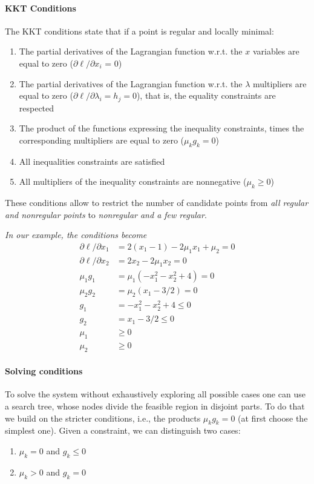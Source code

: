 \paragraph{KKT Conditions} The KKT conditions state that if a point is regular and locally minimal: 
\begin{enumerate}
	\item The partial derivatives of the Lagrangian function w.r.t. the $x$ variables are equal to zero ($\partial \ell / \partial x_i$ = 0)
	
	\item The partial derivatives of the Lagrangian function w.r.t. the $\lambda$ multipliers are equal to zero ($\partial \ell / \partial \lambda_i = h_j = 0$), that is, the equality constraints are respected
	
	\item The product of the functions expressing the inequality constraints, times the corresponding multipliers are equal to zero ($\mu_k g_k = 0$)
	
	\item All inequalities constraints are satisfied
	
	\item All multipliers of the inequality constraints are nonnegative ($\mu_k \geq 0$)
\end{enumerate}
These conditions allow to restrict the number of candidate points from \textit{all regular and nonregular points} to \textit{nonregular and a few regular}.

\textit{In our example, the conditions become}
\begin{align*}
	\partial \ell / \partial x_1 & = 2(x_1 - 1) - 2 \mu_1 x_1 + \mu_2 = 0 \\
	\partial \ell / \partial x_2 & = 2x_2 - 2 \mu_1 x_2 = 0 \\
	\mu_1 g_1 & = \mu_1(-x_1^2 -x_2^2 + 4) = 0 \\
	\mu_2 g_2 & = \mu_2 (x_1 - 3/2) = 0 \\
	g_1 & = -x_1^2 -x_2^2 + 4 \leq 0 \\
	g_2 & = x_1 - 3/2 \leq 0 \\
	\mu_1 & \geq 0 \\
	\mu_2 & \geq 0
\end{align*}

\paragraph{Solving conditions} To solve the system without exhaustively exploring all possible cases one can use a search tree, whose nodes divide the feasible region in disjoint parts. To do that we build on the stricter conditions, i.e., the products $\mu_k g_k = 0$ (at first choose the simplest one). Given a constraint, we can distinguish two cases:
\begin{enumerate}
	\item $\mu_k = 0$ and $g_k \leq 0$
	
	\item $\mu_k > 0$ and $g_k = 0$
\end{enumerate}

